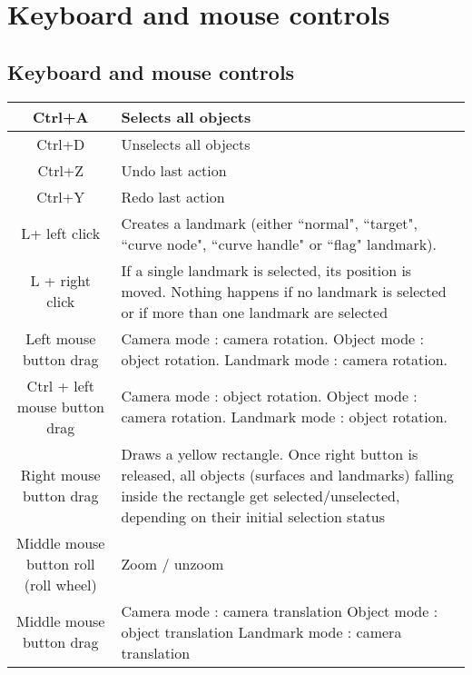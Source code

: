 \chapter{Keyboard and mouse controls}
\minitoc  

 \section{Keyboard and mouse controls}
\begin{tabularx}{\linewidth}{ | c | X | }
 \hline			
   Ctrl+A & Selects all objects \\ \hline				
   Ctrl+D & Unselects all objects \\ \hline				
	 Ctrl+Z & Undo last action \\ \hline				
	Ctrl+Y & Redo last action \\ \hline				
   L+ left click & Creates a landmark (either ``normal", ``target", ``curve node", ``curve handle" or ``flag" landmark). \\ \hline			
L + right click & If a single landmark is selected, its position is
moved. Nothing happens if no landmark is selected
or if more than one landmark are selected \\ \hline			

Left mouse button drag 
& Camera mode : camera rotation.\newline
 Object mode : object rotation.\newline
Landmark mode : camera rotation. \\ \hline			

Ctrl + left mouse button drag 
& Camera mode : object rotation.\newline
 Object mode : camera rotation.\newline
 Landmark mode : object rotation. \\ \hline	
		
Right mouse button drag & Draws a yellow rectangle. Once right button is
released, all objects (surfaces and landmarks)
falling inside the rectangle get selected/unselected,
depending on their initial selection status \\ \hline	
		

Middle mouse button roll (roll wheel) & Zoom / unzoom \\ \hline		
	
Middle mouse button drag 
& Camera mode : camera translation\newline
 Object mode : object translation\newline
 Landmark mode : camera translation \\ \hline	
		

\end{tabularx}
